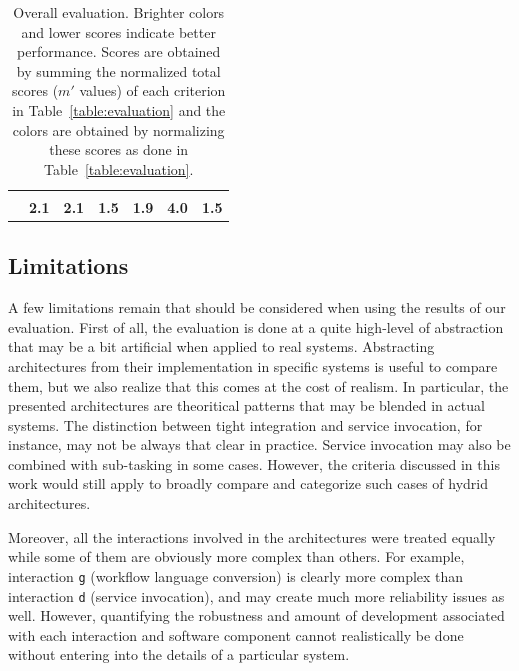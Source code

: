 \documentclass[preprint,3p,twocolumn]{elsarticle}
\begin{document}
\begin{table}
\begin{tabular}{rcccccc}
                                     & \cellcolor[HTML]{99CC99}{0.50}
                                     & \cellcolor[HTML]{99CC99}{0.50}
                                     & \cellcolor[HTML]{99DD99}{0.00}\\
                                    & \cellcolor[HTML]{99E699}\textbf{2.1}
                                    & \cellcolor[HTML]{99E699}\textbf{2.1}
                                    & \cellcolor[HTML]{99FE99}\textbf{1.5}
                                    & \cellcolor[HTML]{99EE99}\textbf{1.9}
                                    & \cellcolor[HTML]{999999}\textbf{4.0}
                                    & \cellcolor[HTML]{99FF99}\textbf{1.5}\\
\end{tabular}
\caption{Overall evaluation. Brighter colors and lower scores indicate better performance. Scores
  are obtained by summing the normalized total scores ($m'$ values) of
  each criterion in Table~\ref{table:evaluation} and the colors are obtained by normalizing these scores
  as done in Table~\ref{table:evaluation}. }
\label{table:overall}
\end{table}

\subsection{Limitations}

A few limitations remain that should be considered when using the
results of our evaluation. First of all, the evaluation is done at a
quite high-level of abstraction that may be a bit artificial when
applied to real systems. Abstracting architectures from their
implementation in specific systems is useful to compare them, but we
also realize that this comes at the cost of realism. In particular,
the presented architectures are theoritical patterns that may be blended in
actual systems. The distinction between tight integration and service
invocation, for instance, may not be always that clear in practice. Service
invocation may also be combined with sub-tasking in some cases. However, the
criteria discussed in this work would still apply to broadly compare and categorize
such cases of hydrid architectures.

Moreover, all the interactions involved in the architectures were
treated equally while some of them are obviously more complex
than others. For example, interaction \texttt{g} (workflow language
conversion) is clearly more complex than interaction \texttt{d}
(service invocation), and may create much more reliability issues as
well. However, quantifying the robustness and amount of development
associated with each interaction and software component cannot
realistically be done without entering into the details of a
particular system.
\end{document}
